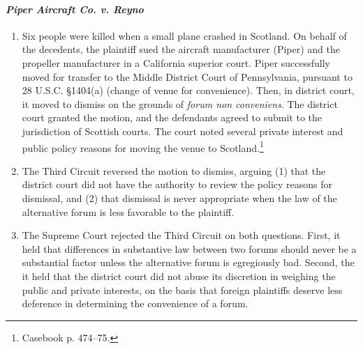 \paragraph{\emph{Piper Aircraft Co. v. Reyno}} %

\begin{enumerate}
    \item Six people were killed when a small plane crashed in Scotland. On behalf of the decedents, the plaintiff sued the aircraft manufacturer (Piper) and the propeller manufacturer in a California superior court. Piper successfully moved for transfer to the Middle District Court of Pennsylvania, pursuant to 28 U.S.C. §1404(a) (change of venue for convenience). Then, in district court, it moved to dismiss on the grounds of \emph{forum non conveniens}. The district court granted the motion, and the defendants agreed to submit to the jurisdiction of Scottish courts. The court noted several private interest and public policy reasons for moving the venue to Scotland.\footnote{Casebook p. 474--75. }
    \item The Third Circuit reversed the motion to dismiss, arguing (1) that the district court did not have the authority to review the policy reasons for dismissal, and (2) that dismissal is never appropriate when the law of the alternative forum is less favorable to the plaintiff.
    \item The Supreme Court rejected the Third Circuit on both questions. First, it held that differences in substantive law between two forums should never be a substantial factor unless the alternative forum is egregiously bad. Second, the it held that the district court did not abuse its discretion in weighing the public and private interests, on the basis that foreign plaintiffs deserve less deference in determining the convenience of a forum.
\end{enumerate}
